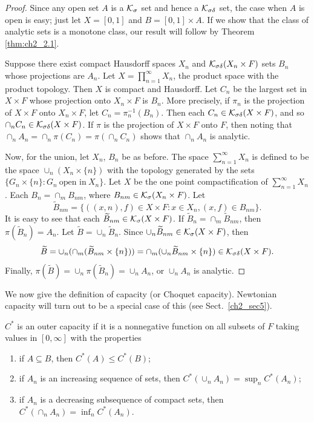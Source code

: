 \begin{proof}
Since any open set $A$ is a $\mathcal{K}_\sigma$ set and hence a $\mathcal{K}_{\sigma\delta}$ set, the case when $A$ is open is easy; just let $X = [0,1]$ and $B = [0,1] \times A$. If we show that the class of analytic sets is a monotone class, our result will follow by Theorem \ref{thm:ch2_2.1}.

Suppose there exist compact Hausdorff spaces $X_n$ and $\mathcal{K}_{\sigma\delta}(X_n \times F)$ sets $B_n$ whose projections are $A_n$. Let $X = \prod_{n=1}^\infty X_n$, the product space with the product topology. Then $X$ is compact and Hausdorff. Let $C_n$ be the largest set in $X \times F$ whose projection onto $X_n \times F$ is $B_n$. More precisely, if $\pi_n$ is the projection of $X \times F$ onto $X_n \times F$, let $C_n = \pi_n^{-1}(B_n)$. Then each $C_n \in \mathcal{K}_{\sigma\delta}(X \times F)$, and so $\cap_n C_n \in \mathcal{K}_{\sigma\delta}(X \times F)$. If $\pi$ is the projection of $X \times F$ onto $F$, then noting that $\cap_n A_n = \cap_n \pi(C_n) = \pi(\cap_n C_n)$ shows that $\cap_n A_n$ is analytic.

Now, for the union, let $X_n$, $B_n$ be as before. The space $\sum_{n=1}^\infty X_n$ is defined to be the space $\cup_n(X_n \times \{n\})$ with the topology generated by the sets $\{G_n \times \{n\} : G_n~\text{open in}~X_n\}$. Let $X$ be the one point compactification of $\sum_{n=1}^\infty X_n$. Each $B_n = \cap_m B_{nm}$, where $B_{nm} \in \mathcal{K}_\sigma(X_n \times F)$. Let
\[
    \widetilde{B}_{nm} = \{((x,n),f) \in X \times F : x \in X_n, (x,f) \in B_{nm}\}.
\]
It is easy to see that each $\widetilde{B}_{nm} \in \mathcal{K}_\sigma(X \times F)$. If $\widetilde{B}_n = \cap_m\widetilde{B}_{nm}$, then $\pi(\widetilde{B}_n) = A_n$. Let $\widetilde{B} = \cup_n\widetilde{B}_n$. Since $\cup_n \widetilde{B}_{nm} \in \mathcal{K}_\sigma(X \times F)$, then
\[
    \widetilde{B} = \cup_n(\cap_m(\widetilde{B}_{nm} \times \{n\})) = \cap_m(\cup_n\widetilde{B}_{nm} \times \{n\}) \in \mathcal{K}_{\sigma\delta}(X \times F).
\]
Finally, $\pi(\widetilde{B}) = \cup_n\pi(\widetilde{B}_n) = \cup_n A_n$, or $\cup_n A_n$ is analytic.
\end{proof}


We now give the definition of capacity (or Choquet capacity). Newtonian capacity will turn out to be a special case of this (see Sect.\ \ref{ch2_sec5}).

\begin{definition}\label{def:ch2_2.4}
$C^*$ is an outer capacity if it is a nonnegative function on all subsets of $F$ taking values in $[0,\infty]$ with the properties
\begin{enumerate}
    \item if $A \subseteq B$, then $C^*(A) \leq C^*(B)$;
    \item if $A_n$ is an increasing sequence of sets, then $C^*(\cup_n A_n) = \sup_n C^*(A_n)$;
    \item if $A_n$ is a decreasing subsequence of compact sets, then $C^*(\cap_n A_n) = \inf_n C^*(A_n)$.
\end{enumerate}
\end{definition}

